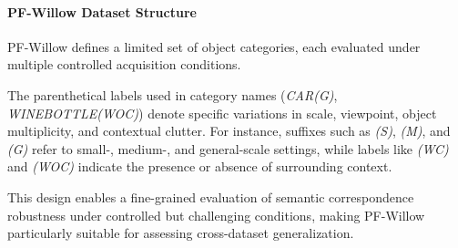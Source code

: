 
\paragraph{PF-Willow Dataset Structure}

PF-Willow defines a limited set of object categories, each evaluated under multiple controlled acquisition conditions.

The parenthetical labels used in category names (\eg \textit{CAR(G)}, \textit{WINEBOTTLE(WOC)}) denote specific variations in scale, viewpoint,
object multiplicity, and contextual clutter.
For instance, suffixes such as \textit{(S)}, \textit{(M)}, and \textit{(G)} refer to small-, medium-, and general-scale settings,
while labels like \textit{(WC)} and \textit{(WOC)} indicate the presence or absence of surrounding context.

This design enables a fine-grained evaluation of semantic correspondence robustness under controlled but challenging conditions,
making PF-Willow particularly suitable for assessing cross-dataset generalization.

